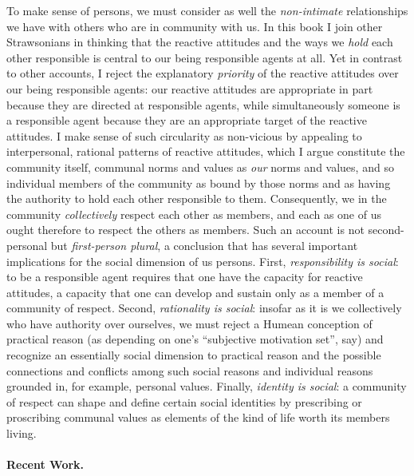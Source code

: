 \documentclass[%
  11pt,%
]{article}
\begin{document}
To make sense of persons, we must consider as well the \emph{non-intimate} relationships we have with others who are in community with us. In this book I join other Strawsonians in thinking that the reactive attitudes and the ways we \emph{hold} each other responsible is central to our being responsible agents at all. Yet in contrast to other accounts, I reject the explanatory \emph{priority} of the reactive attitudes over our being responsible agents: our reactive attitudes are appropriate in part because they are directed at responsible agents, while simultaneously someone is a responsible agent because they are an appropriate target of the reactive attitudes. I make sense of such circularity as non-vicious by appealing to interpersonal, rational patterns of reactive attitudes, which I argue constitute the community itself, communal norms and values as \emph{our} norms and values, and so individual members of the community as bound by those norms and as having the authority to hold each other responsible to them. Consequently, we in the community \emph{collectively} respect each other as members, and each as one of us ought therefore to respect the others as members. Such an account is not second-personal but \emph{first-person plural}, a conclusion that has several important implications for the social dimension of us persons. First, \emph{responsibility is social}: to be a responsible agent requires that one have the capacity for reactive attitudes, a capacity that one can develop and sustain only as a member of a community of respect. Second, \emph{rationality is social}: insofar as it is we collectively who have authority over ourselves, we must reject a Humean conception of practical reason (as depending on one's \enquote{subjective motivation set}, say) and recognize an essentially social dimension to practical reason and the possible connections and conflicts among such social reasons and individual reasons grounded in, for example, personal values. Finally, \emph{identity is social}: a community of respect can shape and define certain social identities by prescribing or proscribing communal values as elements of the kind of life worth its members living.

\paragraph{Recent Work.}
\end{document}
